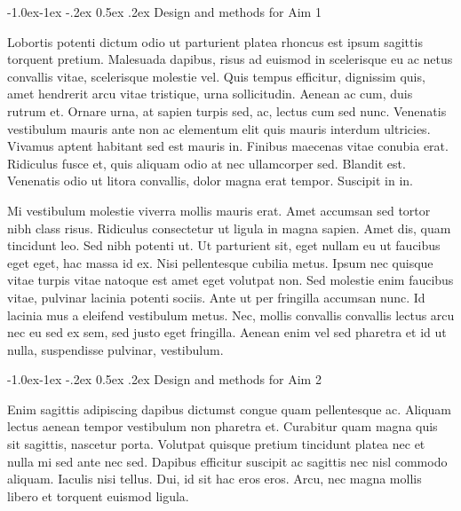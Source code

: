 \documentclass[11pt,]{article}
\makeatletter
\renewcommand\subsubsection{
  \@startsection{subsubsection}{3}{\z@}
    {-1.0ex\@plus -1ex \@minus -.2ex}%
    {0.5ex \@plus .2ex}%
    {\normalfont\normalsize\bf}} %
\makeatother
\begin{document}
\hypertarget{design-and-methods-for-aim-1}{%
\subsubsection{Design and methods for Aim
1}\label{design-and-methods-for-aim-1}}

Lobortis potenti dictum odio ut parturient platea rhoncus est ipsum
sagittis torquent pretium. Malesuada dapibus, risus ad euismod in
scelerisque eu ac netus convallis vitae, scelerisque molestie vel. Quis
tempus efficitur, dignissim quis, amet hendrerit arcu vitae tristique,
urna sollicitudin. Aenean ac cum, duis rutrum et. Ornare urna, at sapien
turpis sed, ac, lectus cum sed nunc. Venenatis vestibulum mauris ante
non ac elementum elit quis mauris interdum ultricies. Vivamus aptent
habitant sed est mauris in. Finibus maecenas vitae conubia erat.
Ridiculus fusce et, quis aliquam odio at nec ullamcorper sed. Blandit
est. Venenatis odio ut litora convallis, dolor magna erat tempor.
Suscipit in in.

Mi vestibulum molestie viverra mollis mauris erat. Amet accumsan sed
tortor nibh class risus. Ridiculus consectetur ut ligula in magna
sapien. Amet dis, quam tincidunt leo. Sed nibh potenti ut. Ut parturient
sit, eget nullam eu ut faucibus eget eget, hac massa id ex. Nisi
pellentesque cubilia metus. Ipsum nec quisque vitae turpis vitae natoque
est amet eget volutpat non. Sed molestie enim faucibus vitae, pulvinar
lacinia potenti sociis. Ante ut per fringilla accumsan nunc. Id lacinia
mus a eleifend vestibulum metus. Nec, mollis convallis convallis lectus
arcu nec eu sed ex sem, sed justo eget fringilla. Aenean enim vel sed
pharetra et id ut nulla, suspendisse pulvinar, vestibulum.

\hypertarget{design-and-methods-for-aim-2}{%
\subsubsection{Design and methods for Aim
2}\label{design-and-methods-for-aim-2}}

Enim sagittis adipiscing dapibus dictumst congue quam pellentesque ac.
Aliquam lectus aenean tempor vestibulum non pharetra et. Curabitur quam
magna quis sit sagittis, nascetur porta. Volutpat quisque pretium
tincidunt platea nec et nulla mi sed ante nec sed. Dapibus efficitur
suscipit ac sagittis nec nisl commodo aliquam. Iaculis nisi tellus. Dui,
id sit hac eros eros. Arcu, nec magna mollis libero et torquent euismod
ligula.
\end{document}
